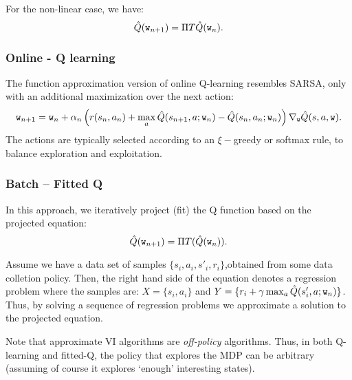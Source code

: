 For the non-linear case, we have:
\begin{equation*}
    \hat{Q}(\texttt{w}_{n+1}) = \Pi T \hat{Q}(\texttt{w}_{n}).
\end{equation*}

\subsubsection{Online - Q learning}
The function approximation version of online Q-learning resembles SARSA, only with an additional maximization over the next action:
\begin{equation*}
    \texttt{w}_{n+1} = \texttt{w}_n + \alpha_n \left( r(s_n,a_n) + \max_a \hat{Q}(s_{n+1},a;\texttt{w}_n) - \hat{Q}(s_{n},a_{n}; \texttt{w}_n) \right) \nabla_{\texttt{w}} \hat{Q}(s,a,\texttt{w}).
\end{equation*}
The actions are typically selected according to an $\xi-$greedy or softmax rule, to balance exploration and exploitation.

\subsubsection{Batch -- Fitted Q}

In this approach, we iteratively project (fit) the Q function based on the projected equation:
\begin{equation*}
    \hat{Q}(\texttt{w}_{n+1}) = \Pi T( \hat{Q}(\texttt{w}_{n})).
\end{equation*}

Assume we have a data set of samples $\{s_i,a_i,s'_i,r_i\}$,obtained from some data colletion policy. Then, the right hand side of the equation denotes a regression problem where the samples are: $X = \{s_i,a_i\}$ and $Y = \{ r_i + \gamma \max_a \hat{Q}(s'_i, a;\texttt{w}_{n})\}$. Thus, by solving a sequence of regression problems we approximate a solution to the projected equation.

Note that approximate VI algorithms are \emph{off-policy} algorithms. Thus, in both Q-learning and fitted-Q, the policy that explores the MDP can be arbitrary (assuming of course it explores `enough' interesting states).
